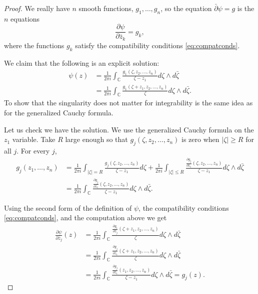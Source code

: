 \documentclass[12pt,openany]{book}
\newcommand{\sabs}[1]{\lvert {#1} \rvert}
\newcommand{\abs}[1]{\left\lvert {#1} \right\rvert}
\newcommand{\C}{{\mathbb{C}}}
\theoremstyle{plain}
\theoremstyle{remark}
\theoremstyle{definition}
\theoremstyle{exercise}
\theoremstyle{example}
\begin{document}
\begin{proof}
We really have $n$ 
smooth functions, $g_1,\ldots,g_n$, so the equation $\bar{\partial} \psi = g$
is the $n$ equations
\begin{equation*}
\frac{\partial \psi}{\partial \bar{z}_k} = g_k ,
\end{equation*}
where the functions $g_k$ satisfy the compatibility conditions
\eqref{eq:compatconds}.

We claim that the following is an explicit solution:
\begin{equation*}
\begin{split}
\psi(z)
& =
\frac{1}{2\pi i}
\int_\C
\frac{
 g_1(\zeta,z_2,\ldots,z_n)
}{\zeta - z_1}
d\zeta \wedge d\bar{\zeta}
\\
& =
\frac{1}{2\pi i}
\int_\C
\frac{
 g_1(\zeta+z_1,z_2,\ldots,z_n)
}{\zeta}
d\zeta \wedge d\bar{\zeta} .
\end{split}
\end{equation*}
To show that the singularity does not matter for integrability is the same
idea as for the generalized Cauchy formula.

Let us check we have the solution.
We use the generalized Cauchy formula on the $z_1$
variable.
Take $R$ large enough so that 
$g_j(\zeta,z_2,\ldots,z_n)$ is zero when $\sabs{\zeta}\geq R$ for all $j$.
For every $j$,
\begin{equation*}
\begin{split}
g_j(z_1,\ldots,z_n) & =
\frac{1}{2\pi i}
\int_{\abs{\zeta}=R}
\frac{g_j(\zeta,z_2,\ldots,z_n)}{\zeta-z_1}
d \zeta
+
\frac{1}{2\pi i}
\int_{\abs{\zeta} \leq R}
\frac{\frac{\partial g_j}{\partial \bar{z}_1}(\zeta,z_2,\ldots,z_n)}{\zeta-z_1}
d\zeta \wedge d\bar{\zeta} 
\\
& =
\frac{1}{2\pi i}
\int_{\C}
\frac{\frac{\partial g_j}{\partial \bar{z}_1}(\zeta,z_2,\ldots,z_n)}{\zeta-z_1}
d\zeta \wedge d\bar{\zeta}  .
\end{split}
\end{equation*}

Using the second form of the definition of $\psi$, the
compatibility conditions \eqref{eq:compatconds}, and the computation above we get
\begin{equation*} 
\begin{split}
\frac{\partial\psi}{\partial \bar{z}_j}(z)
& =
\frac{1}{2\pi i}
\int_\C
\frac{
 \frac{\partial g_1}{\partial \bar{z}_j}(\zeta+z_1,z_2,\ldots,z_n)
}{\zeta}
d\zeta \wedge d\bar{\zeta} 
\\
& =
\frac{1}{2\pi i}
\int_\C
\frac{
 \frac{\partial g_j}{\partial \bar{z}_1}(\zeta+z_1,z_2,\ldots,z_n)
}{\zeta}
d\zeta \wedge d\bar{\zeta} 
\\
& =
\frac{1}{2\pi i}
\int_\C
\frac{
 \frac{\partial g_j}{\partial \bar{z}_1}(z_1,z_2,\ldots,z_n)
}{\zeta-z_1}
d\zeta \wedge d\bar{\zeta} 
=
g_j(z) .
\end{split}
\end{equation*}


\end{proof}
\end{document}

